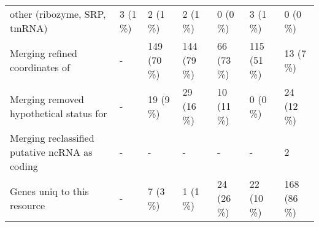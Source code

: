 {\begin{tabular}{lllllll}
\hspace{1em}other (ribozyme, SRP, tmRNA) & 3 (1 \%) & 2 (1 \%) & 2 (1 \%) & 0 (0 \%) & 3 (1 \%) & 0 (0 \%)\\
Merging refined coordinates of & - & 149 (70 \%) & 144 (79 \%) & 66 (73 \%) & 115 (51 \%) & 13 (7 \%)\\
Merging removed hypothetical status for & - & 19 (9 \%) & 29 (16 \%) & 10 (11 \%) & 0 (0 \%) & 24 (12 \%)\\
Merging reclassified putative ncRNA as coding & - & - & - & - & - & 2\\
Genes uniq to this resource & - & 7 (3 \%) & 1 (1 \%) & 24 (26 \%) & 22 (10 \%) & 168 (86 \%)\\
\bottomrule
\end{tabular}}
